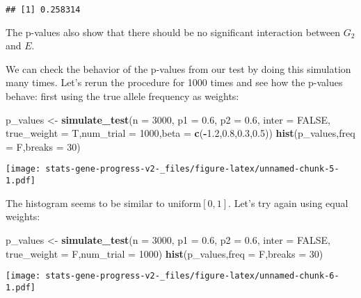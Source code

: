 \documentclass[]{article}
\newenvironment{Shaded}{\begin{snugshade}}{\end{snugshade}}
\newcommand{\DataTypeTok}[1]{\textcolor[rgb]{0.13,0.29,0.53}{#1}}
\newcommand{\DecValTok}[1]{\textcolor[rgb]{0.00,0.00,0.81}{#1}}
\newcommand{\FloatTok}[1]{\textcolor[rgb]{0.00,0.00,0.81}{#1}}
\newcommand{\KeywordTok}[1]{\textcolor[rgb]{0.13,0.29,0.53}{\textbf{#1}}}
\newcommand{\NormalTok}[1]{#1}
\newcommand{\OperatorTok}[1]{\textcolor[rgb]{0.81,0.36,0.00}{\textbf{#1}}}
\newcommand{\OtherTok}[1]{\textcolor[rgb]{0.56,0.35,0.01}{#1}}
\newcommand{\StringTok}[1]{\textcolor[rgb]{0.31,0.60,0.02}{#1}}
\begin{document}
\begin{verbatim}
## [1] 0.258314
\end{verbatim}

The p-values also show that there should be no significant interaction
between \(G_2\) and \(E\).

We can check the behavior of the p-values from our test by doing this
simulation many times. Let's rerun the procedure for 1000 times and see
how the p-values behave: first using the true allele frequency as
weights:

\begin{Shaded}
\begin{Highlighting}[]
\NormalTok{p_values <-}\StringTok{ }\KeywordTok{simulate_test}\NormalTok{(}\DataTypeTok{n =} \DecValTok{3000}\NormalTok{, }\DataTypeTok{p1 =} \FloatTok{0.6}\NormalTok{, }\DataTypeTok{p2 =} \FloatTok{0.6}\NormalTok{, }\DataTypeTok{inter =} \OtherTok{FALSE}\NormalTok{, }\DataTypeTok{true_weight =}\NormalTok{ T,}\DataTypeTok{num_trial =} \DecValTok{1000}\NormalTok{,}\DataTypeTok{beta =} \KeywordTok{c}\NormalTok{(}\OperatorTok{-}\FloatTok{1.2}\NormalTok{,}\FloatTok{0.8}\NormalTok{,}\FloatTok{0.3}\NormalTok{,}\FloatTok{0.5}\NormalTok{))}
\KeywordTok{hist}\NormalTok{(p_values,}\DataTypeTok{freq =}\NormalTok{ F,}\DataTypeTok{breaks =} \DecValTok{30}\NormalTok{)}
\end{Highlighting}
\end{Shaded}

\texttt{[image: stats-gene-progress-v2-\_files/figure-latex/unnamed-chunk-5-1.pdf]}

The histogram seems to be similar to \(\text{uniform}[0,1]\). Let's try
again using equal weights:

\begin{Shaded}
\begin{Highlighting}[]
\NormalTok{p_values <-}\StringTok{ }\KeywordTok{simulate_test}\NormalTok{(}\DataTypeTok{n =} \DecValTok{3000}\NormalTok{, }\DataTypeTok{p1 =} \FloatTok{0.6}\NormalTok{, }\DataTypeTok{p2 =} \FloatTok{0.6}\NormalTok{, }\DataTypeTok{inter =} \OtherTok{FALSE}\NormalTok{, }\DataTypeTok{true_weight =}\NormalTok{ F,}\DataTypeTok{num_trial =} \DecValTok{1000}\NormalTok{)}
\KeywordTok{hist}\NormalTok{(p_values,}\DataTypeTok{freq =}\NormalTok{ F,}\DataTypeTok{breaks =} \DecValTok{30}\NormalTok{)}
\end{Highlighting}
\end{Shaded}

\texttt{[image: stats-gene-progress-v2-\_files/figure-latex/unnamed-chunk-6-1.pdf]}
\end{document}
